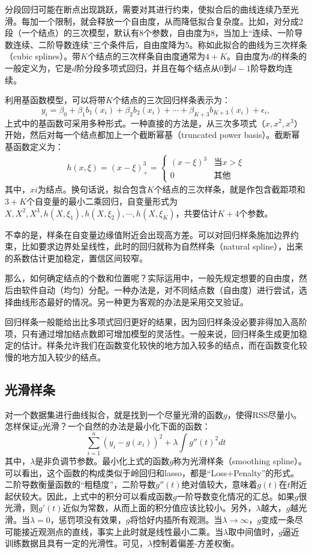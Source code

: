 \documentclass[hyperref,]{ctexart}
\begin{document}
分段回归可能在断点出现跳跃，需要对其进行约束，使拟合后的曲线连续乃至光滑。每加一个限制，就会释放一个自由度，从而降低拟合复杂度。比如，对分成2段（一个结点）的三次模型，默认有8个参数，自由度为8，当加上``连续、一阶导数连续、二阶导数连续''三个条件后，自由度降为5。称如此拟合的曲线为三次样条（cubic
splines）。带\(K\)个结点的三次样条自由度通常为\(4+K\)。自由度为\(d\)的样条的一般定义为，它是\(d\)阶分段多项式回归，并且在每个结点从0到\(d-1\)阶导数均连续。

利用基函数模型，可以将带\(K\)个结点的三次回归样条表示为：
\[y_i = \beta_0 + \beta_1b_1(x_i)+\beta_2b_2(x_i)+\cdots+\beta_{K+3}b_{K+3}(x_i)+\epsilon_i,\]
上式中的基函数可采用多种形式。一种直接的方法是，从三次多项式（\(x,x^2,x^3\)）开始，然后对每一个结点都加上一个截断幂基（truncated
power basis）。截断幂基函数定义为： \[
\begin{eqnarray}
h(x,\xi)=\left(x-\xi\right)^3_+ =
\begin{cases}
(x-\xi)^3 & \mathrm{当} x>\xi \\
0 & \mathrm{其他}
\end{cases}
\end{eqnarray}
\]
其中，\(xi\)为结点。换句话说，拟合包含\(K\)个结点的三次样条，就是作包含截距项和\(3+K\)个自变量的最小二乘回归，自变量形式为\(X,X^2,X^3,h(X,\xi_1),h(X,\xi_2),\cdots,h(X,\xi_K)\)，共要估计\(K+4\)个参数。

不幸的是，样条在自变量边缘值附近会出现高方差。可以对回归样条施加边界约束，比如要求边界处呈线性，此时的回归就称为自然样条（natural
spline），出来的系数估计更加稳定，置信区间较窄。

那么，如何确定结点的个数和位置呢？实际运用中，一般先规定想要的自由度，然后由软件自动（均匀）分配。一种办法是，对不同结点数（自由度）进行尝试，选择曲线形态最好的情况。另一种更为客观的办法是采用交叉验证。

回归样条一般能给出比多项式回归更好的结果，因为回归样条没必要非得加入高阶项，只有通过增加结点数即可增加模型的灵活性。一般来说，回归样条生成更加稳定的估计。样条允许我们在函数变化较快的地方加入较多的结点，而在函数变化较慢的地方加入较少的结点。

\subsection{光滑样条}

对一个数据集进行曲线拟合，就是找到一个尽量光滑的函数\(g\)，使得RSS尽量小。怎样保证\(g\)光滑？一个自然的办法是最小化下面的函数：
\[\sum_{i=1}^n \left(y_i-g(x_i)\right)^2+\lambda\int g''(t)^2dt\]
其中，\(\lambda\)是非负调节参数。最小化上式的函数\(g\)称为光滑样条（smoothing
spline）。可以看出，这个函数的构成类似于岭回归和lasso，都是``Loss+Penalty''的形式。二阶导数衡量函数的``粗糙度''，二阶导数\(g''(t)\)绝对值较大，意味着\(g(t)\)在\(t\)附近起伏较大。因此，上式中的积分可以看成函数\(g\)一阶导数变化情况的汇总。如果\(g\)很光滑，则\(g'(t)\)近似为常数，从而上面的积分值应该比较小。另外，\(\lambda\)越大，\(g\)越光滑。当\(\lambda=0\)，惩罚项没有效果，\(g\)将恰好内插所有观测。当\(\lambda\to\infty\)，\(g\)变成一条尽可能接近观测点的直线，事实上此时就是线性最小二乘。当\(\lambda\)取中间值时，\(g\)逼近训练数据且具有一定的光滑性。可见，\(\lambda\)控制着偏差-方差权衡。
\end{document}
